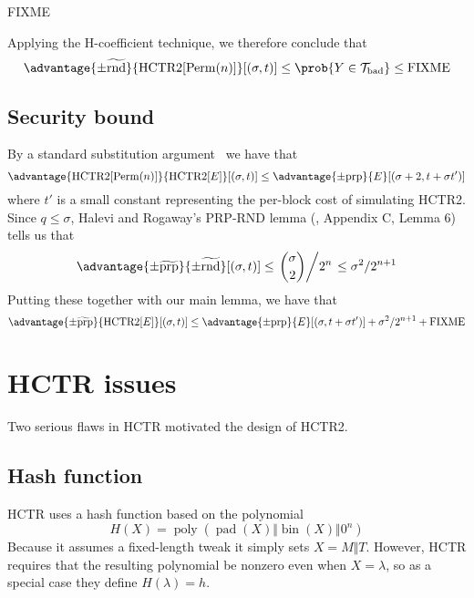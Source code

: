 \documentclass[letterpaper,11pt]{article}
\newcommand*{\Concat}{\Vert}
\newcommand*{\Tb}{\mathcal{T}_\mathrm{bad}}
\DeclareMathOperator{\fromint}{bin}
\DeclareMathOperator{\HCTR}{HCTR2}
\DeclareMathOperator{\pad}{pad}
\DeclareMathOperator{\Perm}{Perm}
\DeclareMathOperator{\poly}{poly}
\begin{document}
FIXME

Applying the H-coefficient technique, we therefore conclude that
\begin{displaymath}
    \advantage{\pm\widetilde{\mathrm{rnd}}}{\HCTR[\Perm(n)]}[(\sigma, t)] \leq
    \prob{Y \in \Tb} \leq \mathrm{FIXME}
\end{displaymath}

\subsection{Security bound}
By a standard substitution argument~\cite{cbcsec,concrete} we have that
\begin{displaymath}
    \advantage{\HCTR[\Perm(n)]}{\HCTR[E]}[(\sigma, t)]
    \leq \advantage{\pm \mathrm{prp}}{E}[(\sigma + 2, t + \sigma t')]
\end{displaymath}
where \(t'\) is a small constant
representing the per-block cost of simulating HCTR2.
Since \(q \leq \sigma\), Halevi and Rogaway's PRP-RND lemma
(\cite{cmc}, Appendix C, Lemma 6) tells us that
\begin{displaymath}
    \advantage{\pm \widetilde{\mathrm{prp}}}{\pm\widetilde{\mathrm{rnd}}}[(\sigma, t)] 
    \leq \left.\binom{\sigma}{2}\middle/2^n\right.
    \leq \sigma^2/2^{n+1}
\end{displaymath}
Putting these together with our main lemma, we have that
\begin{displaymath}
    \advantage{\pm \widetilde{\mathrm{prp}}}{\HCTR[E]}[(\sigma, t)] \leq \advantage{\pm \mathrm{prp}}{E}[(\sigma, t + \sigma t')]
    + \sigma^2/2^{n+1}
    + \mathrm{FIXME}
\end{displaymath}

\section{HCTR issues}\label{hctrflaws}
Two serious flaws in HCTR motivated the design of HCTR2.
\subsection{Hash function}
HCTR uses a hash function based on the polynomial
\begin{displaymath}
    H(X) = \poly(\pad(X) \Concat \fromint(X) \Concat 0^n)
\end{displaymath}
Because it assumes a fixed-length tweak it simply sets \(X = M \Concat T\).
However, HCTR requires that the resulting polynomial be nonzero
even when \(X = \lambda\), so as a special case they define
\(H(\lambda) = h\).
\end{document}
